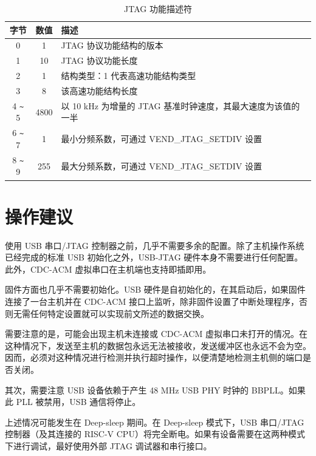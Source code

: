 \documentclass[main\_\_CN.tex]{subfiles}
\begin{document}
\begin{table}[H]
\centering
\caption{JTAG 功能描述符}
\label{tab:usbserialjtag-capabilities-descriptor}

\begin{tabular}{ |c|c|l| } \hline
\rowcolor{lightgray}
\textbf{字节} & \textbf{数值} & \textbf{描述} \\\hline

0 & 1 & JTAG 协议功能结构的版本 \\\hline
1 & 10 & JTAG 协议功能长度 \\\hline
2 & 1 & 结构类型：1 代表高速功能结构类型 \\\hline
3 & 8 & 该高速功能结构长度 \\\hline
4 \verb+~+ 5 & 4800 & 以 10 kHz 为增量的 JTAG 基准时钟速度，其最大速度为该值的一半\\\hline
6 \verb+~+ 7 & 1 & 最小分频系数，可通过 VEND\_JTAG\_SETDIV 设置 \\\hline
8 \verb+~+ 9 & 255 & 最大分频系数，可通过 VEND\_JTAG\_SETDIV 设置 \\\hline
\end{tabular}
\end{table}

\section{操作建议}
\label{sec:usbserialjtag-recommended-operation}

使用 USB 串口/JTAG 控制器之前，几乎不需要多余的配置。除了主机操作系统已经完成的标准 USB 初始化之外，USB-JTAG 硬件本身不需要进行任何配置。此外，CDC-ACM 虚拟串口在主机端也支持即插即用。

固件方面也几乎不需要初始化。USB 硬件是自初始化的，在其启动后，如果固件连接了一台主机并在 CDC-ACM 接口上监听，除非固件设置了中断处理程序，否则无需任何特定设置就可以实现前文所述的数据交换。

需要注意的是，可能会出现主机未连接或 CDC-ACM 虚拟串口未打开的情况。在这种情况下，发送至主机的数据包永远无法被接收，发送缓冲区也永远不会为空。因而，必须对这种情况进行检测并执行超时操作，以便清楚地检测主机侧的端口是否关闭。

其次，需要注意 USB 设备依赖于产生 48 MHz USB PHY 时钟的 BBPLL。如果此 PLL 被禁用，USB 通信将停止。

上述情况可能发生在 Deep-sleep 期间。在 Deep-sleep 模式下，USB 串口/JTAG 控制器（及其连接的 RISC-V CPU）将完全断电。如果有设备需要在这两种模式下进行调试，最好使用外部 JTAG 调试器和串行接口。
\end{document}
